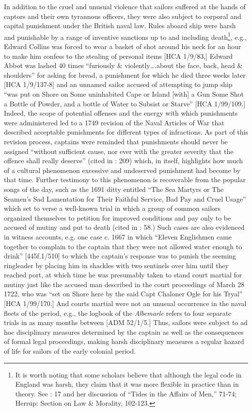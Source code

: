   In addition to the cruel and unusual violence that sailors suffered at the hands of captors and their own tyrannous officers, they were also subject to corporal and capital punishment under the British naval law. Rules aboard ship were harsh and punishable by a range of inventive sanctions up to and including death\footnote{It is worth noting that some scholars believe that although the legal code in England was harsh, they claim that it was more flexible in practice than in theory. See \citealt{Fury2015}: 17 and her discussion of “Tides in the Affairs of Men,” 71-74; Herrup: Section on Law \& Morality, 102-123.}, e.g., Edward Collins was forced to wear a basket of shot around his neck for an hour to make him confess to the stealing of personal items [HCA 1/9/83,] Edward Abbot was lashed 40 times “furiously \& violently….about the face, back, head \& shoulders” for asking for bread, a punishment for which he died three weeks later [HCA 1/9/137-8] and an unnamed sailor accused of attempting to jump ship “was put on Shore on Some uninhabited Cape or Island [with] a Gun Some Shot a Bottle of Powder, and a bottle of Water to Subsist or Starve” [HCA 1/99/109.] Indeed, the scope of potential offenses and the energy with which punishments were administered led to a 1749 revision of the Naval Articles of War that described acceptable punishments for different types of infractions. As part of this revision process, captains were reminded that punishments should never be assigned “without sufficient cause, nor ever with the greater severity that the offence shall really deserve” (cited in \citealt{AdkinsAdkins2008}: 209) which, in itself, highlights how much of a cultural phenomenon excessive and undeserved punishment had become by that time. Further testimony to this phenomenon is recoverable from the popular songs of the day, such as the 1691 ditty entitled “The Sea Martyrs or The Seamen’s Sad Lamentation for Their Faithful Service, Bad Pay and Cruel Usage” which set to verse a well-known trial in which a group of common sailors organized themselves to petition for improved conditions and pay only to be accused of mutiny and put to death (cited in \citealt{Palmer1986}: 58.) Such cases are also evidenced in witness accounts, e.g. one case c. 1667 in which “Eleven Englishmen came together to complain to the captain that they were not allowed water enough to drink” [445f.1/510] to which the captain’s response was to punish the seeming ringleader by placing him in shackles with two sentinels over him until they reached port, at which time he was presumably taken to stand court martial for mutiny just like the accused man described in the court proceedings of March 28 1722, who was “set on Shore here by the said Capt Chaloner Ogle for his Tryal” [HCA 1/99/170.] And courts martial were not an unusual occurrence in the naval fleets of the period, e.g., the logbook of the \textit{Albemarle} refers to four separate trials in as many months between \citealt{JanuaryApril1697} [ADM 52/1/5.] Thus, sailors were subject to ad hoc disciplinary measures determined by the captain as well as the consequences of formal legal proceedings, making harsh disciplinary measures a regular hazard of life for sailors of the early colonial period.

